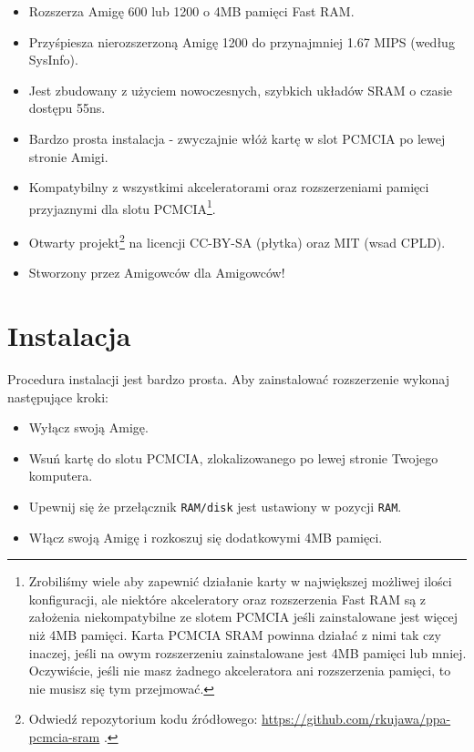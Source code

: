 \documentclass[10pt,a4paper]{article}
\begin{document}
\begin{itemize}
	\item Rozszerza Amigę 600 lub 1200 o 4MB pamięci Fast RAM.
	\item Przyśpiesza nierozszerzoną Amigę 1200 do przynajmniej 1.67 MIPS (według SysInfo).
	\item Jest zbudowany z użyciem nowoczesnych, szybkich układów SRAM o czasie dostępu 55ns.
	\item Bardzo prosta instalacja - zwyczajnie włóż kartę w slot PCMCIA po lewej stronie Amigi.
	\item Kompatybilny z wszystkimi akceleratorami oraz rozszerzeniami pamięci przyjaznymi dla slotu PCMCIA\footnote{Zrobiliśmy wiele aby zapewnić działanie karty w największej możliwej ilości konfiguracji, ale niektóre akceleratory oraz rozszerzenia Fast RAM są z założenia niekompatybilne ze slotem PCMCIA jeśli zainstalowane jest więcej niż 4MB pamięci. Karta PCMCIA SRAM powinna działać z nimi tak czy inaczej, jeśli na owym rozszerzeniu zainstalowane jest 4MB pamięci lub mniej. Oczywiście, jeśli nie masz żadnego akceleratora ani rozszerzenia pamięci, to nie musisz się tym przejmować.}.
	\item Otwarty projekt\footnote{Odwiedź repozytorium kodu źródłowego: \url{https://github.com/rkujawa/ppa-pcmcia-sram} .} na licencji CC-BY-SA (płytka) oraz MIT (wsad CPLD).
	\item Stworzony przez Amigowców dla Amigowców! 
\end{itemize}


\section*{Instalacja}

Procedura instalacji jest bardzo prosta. Aby zainstalować rozszerzenie wykonaj następujące kroki:

\begin{itemize}
	\item Wyłącz swoją Amigę.
	\item Wsuń kartę do slotu PCMCIA, zlokalizowanego po lewej stronie Twojego komputera. 
	\item Upewnij się że przełącznik {\tt RAM/disk} jest ustawiony w pozycji {\tt RAM}.
	\item Włącz swoją Amigę i rozkoszuj się dodatkowymi 4MB pamięci.
\end{itemize}
\end{document}
